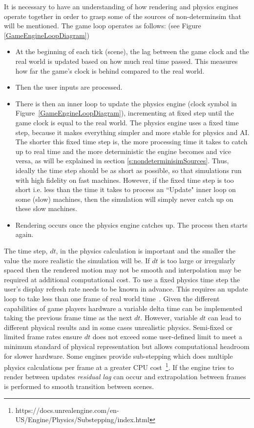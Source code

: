 It is necessary to have an understanding of how rendering and physics engines operate together in order to grasp some of the sources of non-determinsim that will be mentioned. %
The game loop operates as follows: (see Figure \ref{GameEngineLoopDiagram})
\begin{itemize}[leftmargin=*]
    \item At the beginning of each tick (scene), the lag between the game clock and the real world is updated based on how much real time passed. This measures how far the game's clock is behind compared to the real world.
    \item Then the user inputs are processed.
    \item There is then an inner loop to update the physics engine (clock symbol in Figure~\ref{GameEngineLoopDiagram}), incrementing at fixed step until the game clock is equal to the real world. The physics engine uses a fixed time step, because it makes everything simpler and more stable for physics and AI. The shorter this fixed time step is, the more processing time it takes to catch up to real time and the more deterministic the engine becomes and vice versa, as will be explained in section \ref{s:nondeterminisimSources}. Thus, ideally the time step should be as short as possible, so that simulations run with high fidelity on fast machines. However, if the fixed time step is too short i.e. less than the time it takes to process an ``Update" inner loop on some (slow) machines, then the simulation will simply never catch up on these slow machines.
    \item Rendering occurs once the physics engine catches up. The process then starts again.
\end{itemize} 



The time step, $dt$, in the physics calculation is important and the smaller the value the more realistic the simulation will be. If $dt$ is too large or irregularly spaced then the rendered motion may not be smooth and interpolation may be required at additional computational cost. To use a fixed physics time step the user's display refresh rate needs to be known in advance. This requires an update loop to take less than one frame of real world time~\cite{gaffer}. Given the different capabilities of game players hardware a variable delta time can be implemented taking the previous frame time as the next $dt$. However, variable $dt$ can lead to different physical results and in some cases unrealistic physics. Semi-fixed or limited frame rates ensure $dt$ does not exceed some user-defined limit to meet a minimum standard of physical representation but allows computational headroom for slower hardware. Some engines provide sub-stepping which does multiple physics calculations per frame at a greater CPU cost~\footnote{https://docs.unrealengine.com/en-US/Engine/Physics/Substepping/index.html}. If the engine tries to render between updates \textit{residual lag} can occur and extrapolation between frames is performed to smooth transition between scenes.%



